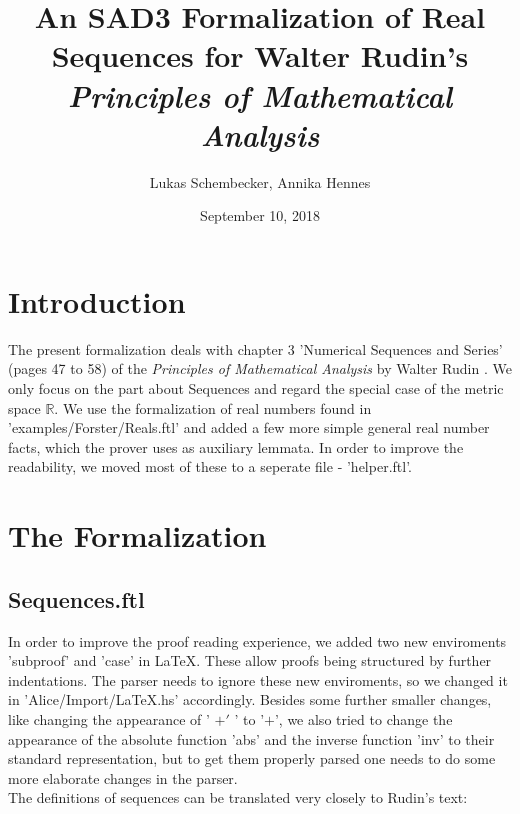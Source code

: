 \documentclass{article}
\begin{document}
\title{An SAD3 Formalization of Real Sequences for Walter Rudin's
\it{Principles of Mathematical Analysis}}

\author{Lukas Schembecker, Annika Hennes}

\date{September 10, 2018}

\maketitle


\section{Introduction}
The present formalization deals with chapter 3 'Numerical Sequences and Series' (pages 47 to 58) of the {\it Principles of Mathematical Analysis} by Walter \linebreak Rudin \cite{Rudin}. We only focus on the part about Sequences and regard the special case of the metric space $\mathbb{R}$. We use the formalization of real numbers found in 'examples/Forster/Reals.ftl' and added a few more simple general real number facts, which the prover uses as auxiliary lemmata. In order to improve the readability, we moved most of these to a seperate file - 'helper.ftl'.

\section{The Formalization}
\subsection{Sequences.ftl}

In order to improve the proof reading experience, we added two new enviroments 'subproof' and 'case' in LaTeX. These allow proofs being structured by further indentations. The parser needs to ignore these new enviroments, so we changed it in 'Alice/Import/LaTeX.hs' accordingly. Besides some further smaller changes, like changing the appearance of ' $+'$ ' to '$+$', we also tried to change the appearance of the absolute function 'abs' and the inverse function 'inv' to their standard representation, but to get them properly parsed one needs to do some more elaborate changes in the parser.\\

\noindent The definitions of sequences can be translated very closely to Rudin's text:
\end{document}
